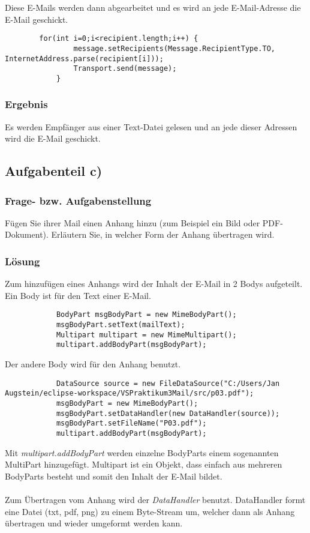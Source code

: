 Diese E-Mails werden dann abgearbeitet und es wird an jede E-Mail-Adresse die E-Mail geschickt.
\begin{lstlisting}
		for(int i=0;i<recipient.length;i++) {
				message.setRecipients(Message.RecipientType.TO, InternetAddress.parse(recipient[i]));
				Transport.send(message);
			}
\end{lstlisting}

\subsubsection{Ergebnis}
Es werden Empfänger aus einer Text-Datei gelesen und an jede dieser Adressen wird die E-Mail geschickt.

\subsection{Aufgabenteil c)}
\subsubsection{Frage- bzw. Aufgabenstellung}
 Fügen Sie ihrer Mail einen Anhang hinzu (zum Beispiel ein Bild oder PDF-Dokument). Erläutern Sie, in welcher Form der Anhang übertragen wird.

\subsubsection{Lösung}
Zum hinzufügen eines Anhangs wird der Inhalt der E-Mail in 2 Bodys aufgeteilt. Ein Body ist für den Text einer E-Mail. \cite{[7]}
\begin{lstlisting}
			BodyPart msgBodyPart = new MimeBodyPart();
			msgBodyPart.setText(mailText);
			Multipart multipart = new MimeMultipart();
			multipart.addBodyPart(msgBodyPart);
\end{lstlisting}


Der andere Body wird für den Anhang benutzt.
\begin{lstlisting}
			DataSource source = new FileDataSource("C:/Users/Jan Augstein/eclipse-workspace/VSPraktikum3Mail/src/p03.pdf");
			msgBodyPart = new MimeBodyPart();
			msgBodyPart.setDataHandler(new DataHandler(source));
			msgBodyPart.setFileName("P03.pdf");
			multipart.addBodyPart(msgBodyPart);
\end{lstlisting}

Mit \textit{multipart.addBodyPart} werden einzelne BodyParts einem sogenannten MultiPart hinzugefügt. Multipart ist ein Objekt, dass einfach aus mehreren BodyParts besteht und somit den Inhalt der E-Mail bildet. \\
\\
Zum Übertragen vom Anhang wird der \textit{DataHandler} benutzt. DataHandler formt eine Datei (txt, pdf, png) zu einem Byte-Stream um, welcher dann als Anhang übertragen und wieder umgeformt werden kann. \cite{8} \\

